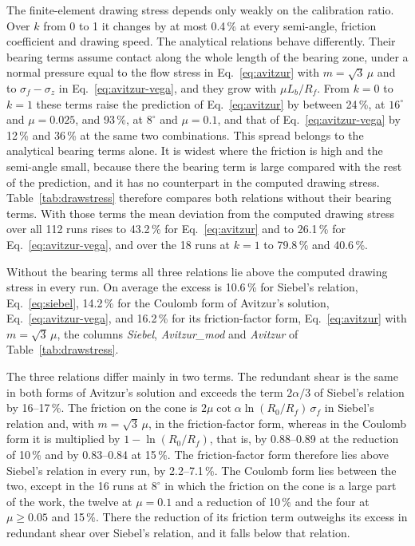 \documentclass[pdflatex,sn-basic,Numbered]{sn-jnl}
\begin{document}
The finite-element drawing stress depends only weakly on the calibration ratio. Over $k$ from 0 to
1 it changes by at most 0.4\,\% at every semi-angle, friction coefficient and drawing speed. The
analytical relations behave differently. Their bearing terms assume contact along the whole length
of the bearing zone, under a normal pressure equal to the flow stress in Eq.~\eqref{eq:avitzur}
with $m=\sqrt3\,\mu$ and to $\sigma_f-\sigma_z$ in Eq.~\eqref{eq:avitzur-vega}, and they grow with
$\mu L_b/R_f$. From $k=0$ to $k=1$ these terms raise the prediction of Eq.~\eqref{eq:avitzur} by
between 24\,\%, at $16^\circ$ and $\mu=0.025$, and 93\,\%, at $8^\circ$ and $\mu=0.1$, and that of
Eq.~\eqref{eq:avitzur-vega} by 12\,\% and 36\,\% at the same two combinations. This spread belongs
to the analytical bearing terms alone. It is widest where the friction is high and the semi-angle
small, because there the bearing term is large compared with the rest of the prediction, and it
has no counterpart in the computed drawing stress. Table~\ref{tab:drawstress} therefore compares
both relations without their bearing terms. With those terms the mean deviation from the computed
drawing stress over all 112 runs rises to 43.2\,\% for Eq.~\eqref{eq:avitzur} and to 26.1\,\% for
Eq.~\eqref{eq:avitzur-vega}, and over the 18 runs at $k=1$ to 79.8\,\% and 40.6\,\%.

Without the bearing terms all three relations lie above the computed drawing stress in every run.
On average the excess is 10.6\,\% for Siebel's relation, Eq.~\eqref{eq:siebel}, 14.2\,\% for the
Coulomb form of Avitzur's solution, Eq.~\eqref{eq:avitzur-vega}, and 16.2\,\% for its
friction-factor form, Eq.~\eqref{eq:avitzur} with $m=\sqrt3\,\mu$, the columns \emph{Siebel},
\emph{Avitzur\_mod} and \emph{Avitzur} of Table~\ref{tab:drawstress}.

The three relations differ mainly in two terms. The redundant shear is the same in both forms of
Avitzur's solution and exceeds the term $2\alpha/3$ of Siebel's relation by 16--17\,\%. The
friction on the cone is $2\mu\cot\alpha\ln(R_0/R_f)\,\sigma_f$ in Siebel's relation and, with
$m=\sqrt3\,\mu$, in the friction-factor form, whereas in the Coulomb form it is multiplied by
$1-\ln(R_0/R_f)$, that is, by 0.88--0.89 at the reduction of 10\,\% and by 0.83--0.84 at 15\,\%.
The friction-factor form therefore lies above Siebel's relation in every run, by 2.2--7.1\,\%.
The Coulomb form lies between the two, except in the 16 runs at $8^\circ$ in which the friction on
the cone is a large part of the work, the twelve at $\mu = 0.1$ and a reduction of 10\,\% and the
four at $\mu \ge 0.05$ and 15\,\%. There the reduction of its friction term outweighs its excess
in redundant shear over Siebel's relation, and it falls below that relation.
\end{document}
